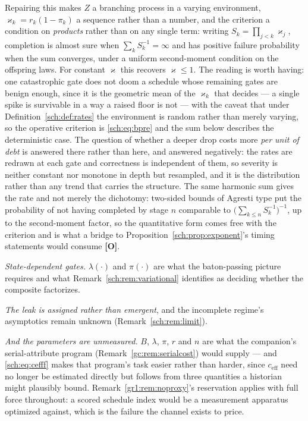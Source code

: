 \documentclass[11pt]{article}
\numberwithin{equation}{section}
\theoremstyle{plain}
\theoremstyle{definition}
\theoremstyle{remark}
\begin{document}
Repairing this makes $Z$ a branching process in a varying environment,
$\varkappa_k=r_k(1-\pi_k)$ a sequence rather than a number, and the criterion a
condition on \emph{products} rather than on any single term: writing
$S_k=\prod_{j<k}\varkappa_j$, completion is almost sure when
$\sum_k S_k^{-1}=\infty$ and has positive failure probability when the
sum converges, under a uniform second-moment condition on the offspring
laws. For constant $\varkappa$ this recovers $\varkappa\le1$. The reading is worth
having: one catastrophic gate does not doom a schedule whose remaining
gates are benign enough, since it is the geometric mean of the $\varkappa_k$
that decides --- a single spike is survivable in a way a raised floor is
not --- with the caveat that under Definition~\ref{sch:def:rates} the
environment is random rather than merely varying, so the operative
criterion is \eqref{sch:eq:bpre} and the sum below describes the
deterministic case. The question of whether a deeper drop costs more
\emph{per unit of debt} is answered there rather than here, and answered
negatively: the rates are redrawn at each gate and correctness is
independent of them, so severity is neither constant nor monotone in
depth but resampled, and it is the distribution rather than any trend
that carries the structure. The same harmonic sum gives the rate and not
merely the dichotomy:
two-sided bounds of Agresti type put the probability of not having
completed by stage $n$ comparable to $\bigl(\sum_{k\le n}S_k^{-1}
\bigr)^{-1}$, up to the second-moment factor, so the quantitative form
comes free with the criterion and is what a bridge to
Proposition~\ref{sch:prop:exponent}'s timing statements would consume
\textbf{[O]}.

\emph{State-dependent gates.} $\lambda(\cdot)$ and $\pi(\cdot)$ are what
the baton-passing picture requires and what
Remark~\ref{sch:rem:variational} identifies as deciding whether the
composite factorizes.

\emph{The leak is assigned rather than emergent}, and the incomplete
regime's asymptotics remain unknown (Remark~\ref{sch:rem:limit}).

\emph{And the parameters are unmeasured.} $B$, $\lambda$, $\pi$, $r$ and
$n$ are what the companion's serial-attribute program
(Remark~\ref{gc:rem:serialcost}) would supply --- and \eqref{sch:eq:cefff}
makes that program's task easier rather than harder, since
$c_{\mathrm{eff}}$ need no longer be estimated directly but follows from
three quantities a historian might plausibly bound.
Remark~\ref{gr1:rem:noproxy}'s reservation applies with full force
throughout: a scored schedule index would be a measurement apparatus
optimized against, which is the failure the channel exists to price.
\end{document}
